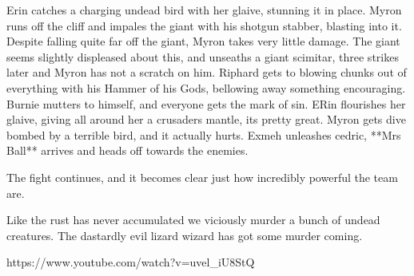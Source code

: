 Erin catches a charging undead bird with her glaive, stunning it in place. Myron runs off the cliff and impales the giant with his shotgun stabber, blasting into it. Despite falling quite far off the giant, Myron takes very little damage. The giant seems slightly displeased about this, and unseaths a giant scimitar, three strikes later and Myron has not a scratch on him. Riphard gets to blowing chunks out of everything with his Hammer of his Gods, bellowing away something encouraging. Burnie mutters to himself, and everyone gets the mark of sin. ERin flourishes her glaive, giving all around her a crusaders mantle, its pretty great. Myron gets dive bombed by a terrible bird, and it actually hurts. Exmeh unleashes cedric, **Mrs Ball** arrives and heads off towards the enemies.\medskip

The fight continues, and it becomes clear just how incredibly powerful the team are.\medskip

Like the rust has never accumulated we viciously murder a bunch of undead creatures. The dastardly evil lizard wizard has got some murder coming.\medskip

https://www.youtube.com/watch?v=uvel\_iU8StQ\medskip

\vspace*{5mm}

